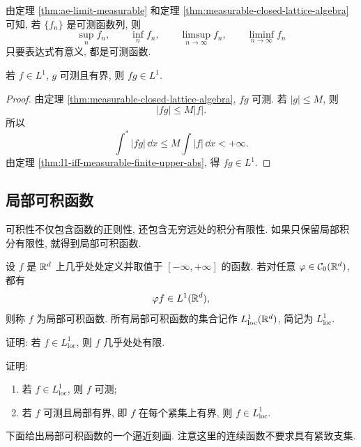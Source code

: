 由定理 \ref{thm:ae-limit-measurable} 和定理 \ref{thm:measurable-closed-lattice-algebra} 可知, 若 \(\{f_n\}\) 是可测函数列, 则
\[
\sup_n f_n,
\qquad
\inf_n f_n,
\qquad
\limsup_{n\to\infty}f_n,
\qquad
\liminf_{n\to\infty}f_n
\]
只要表达式有意义, 都是可测函数.

\begin{cor}\label{cor:l1-times-bounded-measurable}
	若 \(f\in L^1\), \(g\) 可测且有界, 则 \(fg\in L^1\).
\end{cor}

\begin{proof}
	由定理 \ref{thm:measurable-closed-lattice-algebra}, \(fg\) 可测. 若 \(|g|\leq M\), 则
	\[
	|fg|\leq M|f|.
	\]
	所以
	\[
	\int^* |fg|\,\dd x\leq M\int |f|\,\dd x<+\infty.
	\]
	由定理 \ref{thm:l1-iff-measurable-finite-upper-abs}, 得 \(fg\in L^1\).
\end{proof}

\subsection{局部可积函数}

可积性不仅包含函数的正则性, 还包含无穷远处的积分有限性. 如果只保留局部积分有限性, 就得到局部可积函数.

\begin{defn}[局部可积函数]
	\label{def:locally-integrable-function}
	设 \(f\) 是 \(\mathbb{R}^d\) 上几乎处处定义并取值于 \([-\infty,+\infty]\) 的函数. 若对任意 \(\varphi\in\mathcal{C}_0(\mathbb{R}^d)\), 都有
	\[
	\varphi f\in L^1(\mathbb{R}^d),
	\]
	则称 \(f\) 为局部可积函数. 所有局部可积函数的集合记作 \(L^1_{\operatorname{loc}}(\mathbb{R}^d)\), 简记为 \(L^1_{\operatorname{loc}}\).
\end{defn}

\begin{exer}\label{exer:locally-integrable-finite-ae}
	证明: 若 \(f\in L^1_{\operatorname{loc}}\), 则 \(f\) 几乎处处有限.
\end{exer}

\begin{exer}\label{exer:locally-integrable-basic}
	证明:
	\begin{enumerate}
		\item 若 \(f\in L^1_{\operatorname{loc}}\), 则 \(f\) 可测;
		\item 若 \(f\) 可测且局部有界, 即 \(f\) 在每个紧集上有界, 则 \(f\in L^1_{\operatorname{loc}}\).
	\end{enumerate}
\end{exer}

下面给出局部可积函数的一个逼近刻画. 注意这里的连续函数不要求具有紧致支集.

